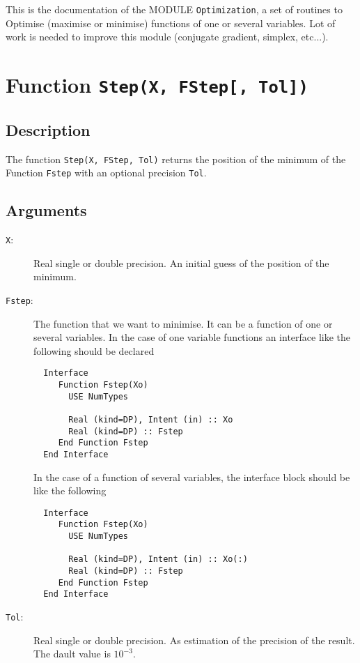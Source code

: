 
This is the documentation of the MODULE \texttt{Optimization}, a set
of routines to Optimise (maximise or minimise) functions of one or
several variables. Lot of work is needed to improve this module
(conjugate gradient, simplex, etc...).

\section{Function \texttt{Step(X, FStep[, Tol]) }}

\subsection{Description}

The function \texttt{Step(X, FStep, Tol)} returns the position of the
minimum of the Function \texttt{Fstep} with an optional precision
\texttt{Tol}. 

\subsection{Arguments}

\begin{description}
\item[\texttt{X}:] Real single or double precision. An initial guess
  of the position of the minimum.
\item[\texttt{Fstep}:]  The function that we want to minimise. It can
  be a function of one or several variables. In the case of one
  variable functions an interface like the following should be
  declared
\begin{verbatim}
  Interface
     Function Fstep(Xo)
       USE NumTypes
       
       Real (kind=DP), Intent (in) :: Xo
       Real (kind=DP) :: Fstep
     End Function Fstep
  End Interface
\end{verbatim}
  In the case of a function of several variables, the interface block
  should be like the following
\begin{verbatim}
  Interface
     Function Fstep(Xo)
       USE NumTypes
       
       Real (kind=DP), Intent (in) :: Xo(:)
       Real (kind=DP) :: Fstep
     End Function Fstep
  End Interface
\end{verbatim}

\item[\texttt{Tol}:] Real single or double precision. As estimation of
  the precision of the result. The dault value is $10^{-3}$.
  
\end{description}

